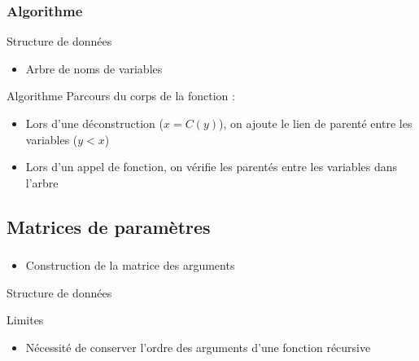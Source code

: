 \begin{frame}
  \frametitle{Algorithme}
  \begin{block}{Structure de données}
    \begin{itemize}
    \item Arbre de noms de variables
    \end{itemize}
  \end{block}
  \begin{block}{Algorithme}
    Parcours du corps de la fonction :
    \begin{itemize}
      \item Lors d'une déconstruction ($x = C(y)$), on ajoute le lien de parenté entre les variables ($y < x$)
      \item Lors d'un appel de fonction, on vérifie les parentés entre les variables dans l'arbre
    \end{itemize}
  \end{block}
\end{frame}

\subsection{Matrices de paramètres}

\begin{frame}
  \frametitle{}
  \begin{block}{}
    \begin{itemize}
      \item Construction de la matrice des arguments
    \end{itemize}
  \end{block}
  \begin{block}{Structure de données}
  \end{block}
  \begin{block}{Limites}
    \begin{itemize}
      \item Nécessité de conserver l'ordre des arguments d'une fonction récursive
    \end{itemize}
  \end{block}
\end{frame}

